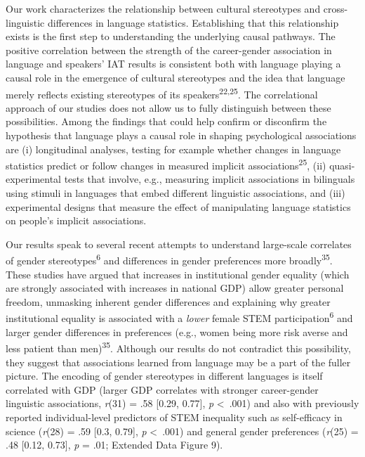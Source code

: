 \documentclass[11pt]{wlscirep}
\begin{document}
Our work characterizes the relationship between cultural stereotypes and cross-linguistic differences in language statistics. Establishing that this relationship exists is the first step to understanding the underlying causal pathways. The positive correlation between the strength of the career-gender association in language and speakers' IAT results is consistent both with language playing a causal role in the emergence of cultural stereotypes and the idea that language merely reflects existing stereotypes of its speakers\textsuperscript{22,25}. The correlational approach of our studies does not allow us to fully distinguish between these possibilities. Among the findings that could help confirm or disconfirm the hypothesis that language plays a causal role in shaping psychological associations are (i) longitudinal analyses, testing for example whether changes in language statistics predict or follow changes in measured implicit associations\textsuperscript{25}, (ii) quasi-experimental tests that involve, e.g., measuring implicit associations in bilinguals using stimuli in languages that embed different linguistic associations, and (iii) experimental designs that measure the effect of manipulating language statistics on people's implicit associations.

Our results speak to several recent attempts to understand large-scale correlates of gender stereotypes\textsuperscript{6} and differences in gender preferences more broadly\textsuperscript{35}. These studies have argued that increases in institutional gender equality (which are strongly associated with increases in national GDP) allow greater personal freedom, unmasking inherent gender differences and explaining why greater institutional equality is associated with a \textit{lower} female STEM participation\textsuperscript{6} and larger gender differences in preferences (e.g., women being more risk averse and less patient than men)\textsuperscript{35}. Although our results do not contradict this possibility, they suggest that associations learned from language may be a part of the fuller picture. The encoding of gender stereotypes in different languages is itself correlated with GDP (larger GDP correlates with stronger career-gender linguistic associations, \emph{r}(31) = .58 {[}0.29, 0.77{]}, \emph{p} \textless\ .001) and also with previously reported individual-level predictors of STEM inequality such as self-efficacy in science  (\emph{r}(28) = .59 {[}0.3, 0.79{]}, \emph{p} \textless\ .001) and general gender preferences (\emph{r}(25) = .48 {[}0.12, 0.73{]}, \emph{p} = .01; Extended Data Figure 9).
\end{document}
